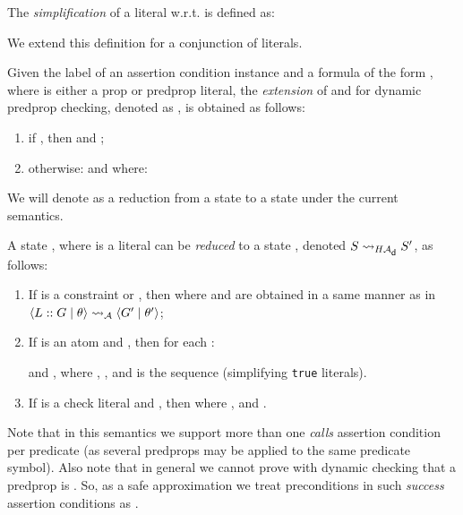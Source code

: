 \documentclass{llncs}
\newcommand{\A}
  {\ensuremath{{\cal A}}}
\newcommand{\gd}[0]{\mid}
\newcommand{\state}[2]
  {\ensuremath{\langle #1 \gd{} #2 \rangle}}
\newcommand{\reductionA}[2]
  {\ensuremath{#1 \leadsto_{\A} #2}}
\newcommand{\reductionHAd}[2]
  {\ensuremath{#1 \leadsto_{H\A_{\textsf{\scriptsize{d}}}} #2}}
\begin{document}
\begin{definition}
  The \emph{simplification} of a literal  w.r.t.
   is defined as:
  
  We extend this definition for a conjunction of
  literals.
\end{definition}

\begin{definition}
  \label{def:ae-extension}
  Given the label  of an assertion condition instance and a
  formula of the form , where
   is either a prop or predprop literal, the
  \emph{extension} of  and  for dynamic
  predprop checking, denoted as
  , is obtained as follows:
  \begin{enumerate}
  \item
    if ,
    then  and ;
  \item
    otherwise:  and 
     where:
    
  \end{enumerate}
\end{definition}



We will denote as  a reduction from a state 
to a state  under the current semantics. 
\begin{definition}
  \label{def:ho-ho-reductions}
  A state , where  is a literal
  can be \emph{reduced} to a state , denoted \reductionHAd{S}{S'},
  as follows:
  \begin{enumerate}\setlength{\itemsep}{0mm}\setlength{\parskip}{0mm}
  \item 
    If  is a constraint or , then
     where  and 
    are obtained in a same manner as in
    \reductionA{\state{L::G}{\theta}}{\state{G'}{\theta'}};
  \item 
    If  is an atom and ,
    then for each :
      
      and ,
      where ,
      ,
      and  is the sequence 
      (simplifying \texttt{true} literals).
  \item 
    If  is a check literal  and
    , then  where
    ,
     and .
  \end{enumerate}
\end{definition}

Note that in this semantics we support more than one \emph{calls}
assertion condition per predicate (as several predprops may be applied
to the same predicate symbol).
Also note that in general we cannot prove with dynamic checking that
a predprop is . So, as a safe approximation we treat
preconditions in such \emph{success} assertion conditions as
.
\end{document}
